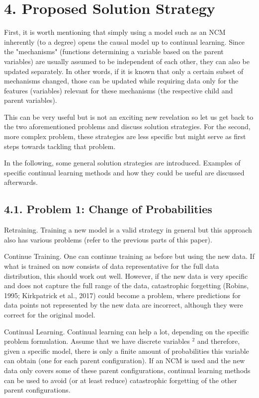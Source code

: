 \documentclass[10pt]{article}
\begin{document}
\section*{4. Proposed Solution Strategy}
First, it is worth mentioning that simply using a model such as an NCM inherently (to a degree) opens the causal model up to continual learning. Since the "mechanisms" (functions determining a variable based on the parent variables) are usually assumed to be independent of each other, they can also be updated separately. In other words, if it is known that only a certain subset of mechanisms changed, those can be updated while requiring data only for the features (variables) relevant for these mechanisms (the respective child and parent variables).

This can be very useful but is not an exciting new revelation so let us get back to the two aforementioned problems and discuss solution strategies. For the second, more complex problem, these strategies are less specific but might serve as first steps towards tackling that problem.

In the following, some general solution strategies are introduced. Examples of specific continual learning methods and how they could be useful are discussed afterwards.

\subsection*{4.1. Problem 1: Change of Probabilities}
Retraining. Training a new model is a valid strategy in general but this approach also has various problems (refer to the previous parts of this paper).

Continue Training. One can continue training as before but using the new data. If what is trained on now consists of data representative for the full data distribution, this should work out well. However, if the new data is very specific and does not capture the full range of the data, catastrophic forgetting (Robins, 1995; Kirkpatrick et al., 2017) could become a problem, where predictions for data points not represented by the new data are incorrect, although they were correct for the original model.

Continual Learning. Continual learning can help a lot, depending on the specific problem formulation. Assume that we have discrete variables ${ }^{2}$ and therefore, given a specific model, there is only a finite amount of probabilities this variable can obtain (one for each parent configuration). If an NCM is used and the new data only covers some of these parent configurations, continual learning methods can be used to avoid (or at least reduce) catastrophic forgetting of the other parent configurations.
\end{document}
